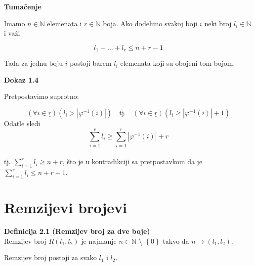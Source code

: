 \documentclass[12pt,a4paper]{article}
\begin{document}
	{\noindent\fontsize{12pt}{12pt}\textbf{Tumačenje}}
	\vspace{0.5em}

	\noindent Imamo $n \in \mathbb{N}$ elemenata i $r \in \mathbb{N}$ boja. Ako dodelimo svakoj boji $i$
	neki broj $l_{i} \in \mathbb{N}$ i važi
	\vspace{0.5em}

	\[l_{1}+\dots+l_{r} \leq n+r-1\]
	\vspace{0.5em}

	\noindent Tada za jednu boju $i$ postoji barem $l_{i}$ elemenata koji su obojeni tom bojom.

	\vspace{1.5em}

	{\noindent\fontsize{12pt}{12pt}\textbf{Dokaz 1.4}}
	\vspace{0.5em}

	\noindent Pretpostavimo suprotno:

	\[(\forall i \in \underline{r}) (l_{i} > |\varphi^{-1}(i)|) \quad \text{tj.}\quad (\forall i \in \underline{r})(l_{i} \geq |\varphi^{-1}(i)|+1)\]
	Odatle sledi \[ \sum_{i=1}^{r} l_{i} \geq \sum_{i=1}^{r}|\varphi^{-1}(i)|+r\] 
	\\tj. $ \sum_{i=1}^{r} l_{i} \geq n+r$,
	što je u kontradikciji sa pretpostavkom da je $\sum_{i=1}^{r} l_{i} \leq n+r-1$.


	\newpage
	
	
	\section{Remzijevi brojevi}
	\vspace{1em}
	\begin{mdframed}
	{\fontsize{12pt}{12pt}\textbf{Definicija 2.1 (Remzijev broj za dve boje)}}
	\vspace{0.5em}	
	\\
	Remzijev broj $R(l_{1}, l_{2})$ je najmanje $n \in \mathbb{N}$ \textbackslash {} $\left\lbrace 0\right\rbrace $ takvo da $n\rightarrow(l_{1}, l_{2})$.
	\end{mdframed}
	
	\noindent Remzijev broj postoji za svako $l_1$ i $l_2$.
	
	\vspace{0.7em}
	
\end{document}
